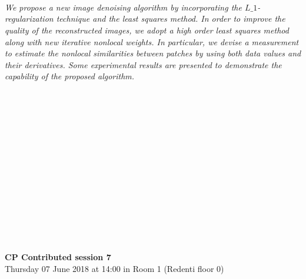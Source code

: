 \begin{multicols}{2}
      \\\\
\\
    \textit{We propose a new image denoising algorithm by incorporating the $L\_1$-regularization technique and the least squares method. In order to improve the quality of the reconstructed images, we adopt a high order least squares method along with new iterative nonlocal weights. In particular, we devise a measurement to estimate the nonlocal similarities between patches by using both data values and their derivatives. Some experimental results are presented to demonstrate the capability of the proposed algorithm.
}\\
\\ 
      \\
      \\\\
      \\
      \\\\
      \\
      \\\\
      \\
      \\\\
\\
  \end{multicols}
  \noindent\textbf{CP Contributed session 7}\\
    Thursday 07 June 2018 at 14:00 in Room 1 (Redenti floor 0)  \\
  \textit{} \\
    
